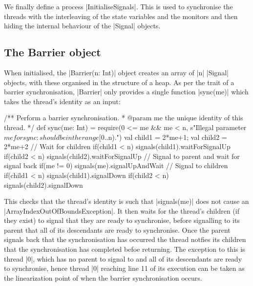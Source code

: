 We finally define a process |InitialiseSignals|. This is used to synchronise the threads with the interleaving of the state variables and the monitors and then hiding the internal behaviour of the |Signal| objects.


\subsection{The Barrier object}
\inlineScala
When initialised, the |Barrier(n: Int)| object creates an array of |n| |Signal| objects, with these organised in the structure of a heap. As per the trait of a barrier synchronisation, |Barrier| only provides a single function |sync(me)| which takes the thread's identity as an input:

\begin{scala}
  /** Perform a barrier synchronisation.
    * @param me the unique identity of this thread. */
  def sync(me: Int) = {
    require(0 <= me && me < n, 
      s"Illegal parameter $me for sync: should be in the range [0..$n).")
    val child1 = 2*me+1; val child2 = 2*me+2
    // Wait for children
    if(child1 < n) signals(child1).waitForSignalUp
    if(child2 < n) signals(child2).waitForSignalUp
    // Signal to parent and wait for signal back
    if(me != 0) signals(me).signalUpAndWait
    // Signal to children
    if(child1 < n) signals(child1).signalDown
    if(child2 < n) signals(child2).signalDown
  }  
\end{scala}

This checks that the thread's identity is such that |signals(me)| does not cause an 
|ArrayIndexOutOfBoundsException|. It then waits for the thread's children (if they exist) to signal that they are ready to synchronise, before signalling to its parent that all of its descendants are ready to synchronise. Once the parent signals back that the synchronisation has occurred the thread notfies its children that the synchronisation has completed befoe returning. The exception to this is thread |0|, which has no parent to signal to and all of its descendants are ready to synchronise, hence thread |0| reaching line 11 of its execution can be taken as the linearization point of when the barrier synchronisation occurs.

